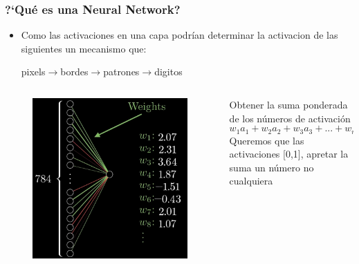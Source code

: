 \documentclass[10pt]{beamer}
\begin{document}
\begin{frame}
\frametitle{?`Qu\'e es una Neural Network?}
\begin{beamerboxesrounded}[upper=uppercolor, lower=lowercolor, shadow=true]{} 

\begin{itemize}
\item Como las activaciones en una capa podr\'ian determinar la activacion de las siguientes un mecanismo que:\\
\begin{center}
\mbox{pixels$\rightarrow$bordes$\rightarrow$patrones$\rightarrow$digitos}
\end{center}
 
\end{itemize}
\end{beamerboxesrounded}

\begin{columns}
\begin{column}{.5\textwidth}
  \begin{figure}
  \includegraphics[scale=0.155]{./Figures/weights.png}
 \end{figure}  
\end{column}%

\begin{column}{.5\textwidth}
Obtener la suma ponderada de los n\'umeros de activaci\'on
\begin{equation*}
w_1 a_1+w_2 a_2+w_3 a_3+...+w_n a_n
\end{equation*}
Queremos que las activaciones [0,1], apretar la suma un n\'umero no cualquiera



\end{column}%
\end{columns}
\end{frame}
\end{document}

